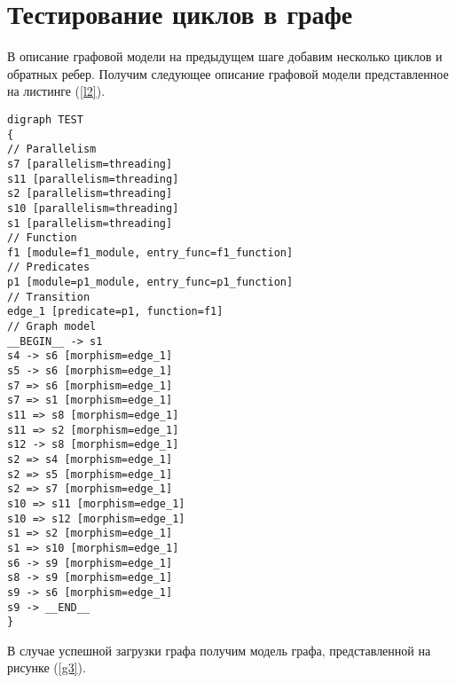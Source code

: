 \section{Тестирование циклов в графе}
В описание графовой модели на предыдущем шаге добавим несколько циклов и обратных ребер. Получим следующее описание графовой модели представленное на листинге (\ref{l2}).
\begin{lstlisting}[label=l2, caption={\textit{ Пример описание графовой модели в формате aDOT включающей циклы}}]
digraph TEST
{
// Parallelism
s7 [parallelism=threading]
s11 [parallelism=threading]
s2 [parallelism=threading]
s10 [parallelism=threading]
s1 [parallelism=threading]
// Function
f1 [module=f1_module, entry_func=f1_function]
// Predicates
p1 [module=p1_module, entry_func=p1_function]
// Transition
edge_1 [predicate=p1, function=f1]
// Graph model
__BEGIN__ -> s1
s4 -> s6 [morphism=edge_1]
s5 -> s6 [morphism=edge_1]
s7 => s6 [morphism=edge_1]
s7 => s1 [morphism=edge_1]
s11 => s8 [morphism=edge_1]
s11 => s2 [morphism=edge_1]
s12 -> s8 [morphism=edge_1]
s2 => s4 [morphism=edge_1]
s2 => s5 [morphism=edge_1]
s2 => s7 [morphism=edge_1]
s10 => s11 [morphism=edge_1]
s10 => s12 [morphism=edge_1]
s1 => s2 [morphism=edge_1]
s1 => s10 [morphism=edge_1]
s6 -> s9 [morphism=edge_1]
s8 -> s9 [morphism=edge_1]
s9 -> s6 [morphism=edge_1]
s9 -> __END__
}
\end{lstlisting}

В случае успешной загрузки графа получим модель графа, представленной на рисунке (\ref{g3}).